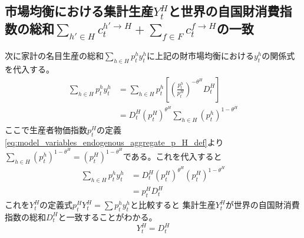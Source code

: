 \subsection{市場均衡における集計生産\(Y_t^H\)と世界の自国財消費指数の総和\(\sum_{h'\in H}c_t^{h'\to H}+\sum_{f\in F}c_t^{f\to H}\)の一致}
\label{sec:main_appendix_aggregate_output_home_Y_H_sum_c_h_H_plus_c_f_H_sum_p_h_y_h}
次に家計の名目生産の総和\(\sum_{h\in H}p_t^hy_t^h\)に上記の財市場均衡における\(y_t^h\)の関係式を代入する。
\begin{align}
\label{eq:main_appendix_aggregate_output_home_Y_H_sum_c_h_H_plus_c_f_H_sum_p_h_y_h_eq}
    \sum_{h\in H}p_t^hy_t^h&=\sum_{h\in H}p_t^h\left[\left(\frac{p_t^h}{p_t^H}\right)^{-\theta^H}D_t^H\right] \\
    &=D_t^H(p_t^H)^{\theta^H}\sum_{h\in H}(p_t^h)^{1-\theta^H}
\end{align}
ここで生産者物価指数\(p_t^H\)の定義\eqref{eq:model_variables_endogenous_aggregate_p_H_def}より
\(\sum_{h\in H}(p_t^h)^{1-\theta^H}=(p_t^H)^{1-\theta^H}\)である。これを代入すると
\begin{align}
\label{eq:main_appendix_aggregate_output_home_Y_H_sum_c_h_H_plus_c_f_H_sum_p_h_y_h_modified_eq}
    \sum_{h\in H}p_t^hy_t^h&=D_t^H(p_t^H)^{\theta^H}(p_t^H)^{1-\theta^H} \\
    &=p_t^HD_t^H
\end{align}
これを\(Y_t^H\)の定義式\(p_t^HY_t^H=\sum p_t^hy_t^h\)と比較すると
集計生産\(Y_t^H\)が世界の自国財消費指数の総和\(D_t^H\)と一致することがわかる。
\begin{equation}
\label{eq:main_appendix_aggregate_output_home_Y_H_sum_c_h_H_plus_c_f_H_Y_H_D_H_eq}
    Y_t^H=D_t^H
\end{equation}

